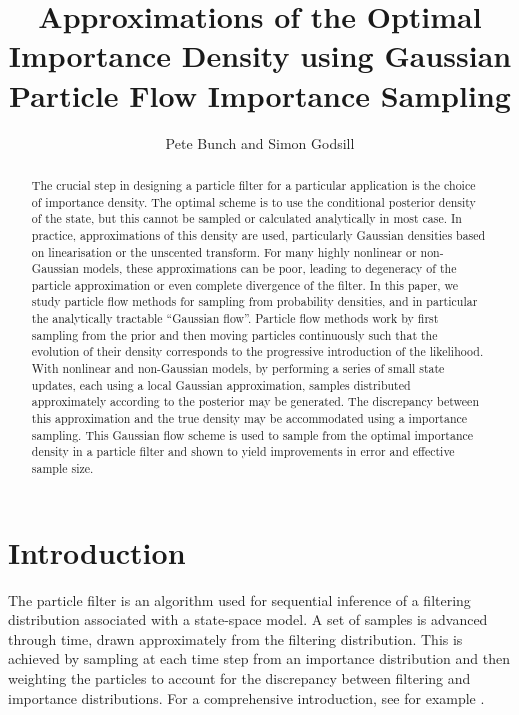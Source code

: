 \documentclass{article}
\title{Approximations of the Optimal Importance Density using Gaussian Particle Flow Importance Sampling}
\author{Pete Bunch and Simon Godsill}
\date{}
\begin{document}
\maketitle

\begin{abstract}
The crucial step in designing a particle filter for a particular application is the choice of importance density. The optimal scheme is to use the conditional posterior density of the state, but this cannot be sampled or calculated analytically in most case. In practice, approximations of this density are used, particularly Gaussian densities based on linearisation or the unscented transform. For many highly nonlinear or non-Gaussian models, these approximations can be poor, leading to degeneracy of the particle approximation or even complete divergence of the filter. In this paper, we study particle flow methods for sampling from probability densities, and in particular the analytically tractable ``Gaussian flow''. Particle flow methods work by first sampling from the prior and then moving particles continuously such that the evolution of their density corresponds to the progressive introduction of the likelihood. With nonlinear and non-Gaussian models, by performing a series of small state updates, each using a local Gaussian approximation, samples distributed approximately according to the posterior may be generated. The discrepancy between this approximation and the true density may be accommodated using a importance sampling. This Gaussian flow scheme is used to sample from the optimal importance density in a particle filter and shown to yield improvements in error and effective sample size.
\end{abstract}






\section{Introduction}

The particle filter is an algorithm used for sequential inference of a filtering distribution associated with a state-space model. A set of samples is advanced through time, drawn approximately from the filtering distribution. This is achieved by sampling at each time step from an importance distribution and then weighting the particles to account for the discrepancy between filtering and importance distributions. For a comprehensive introduction, see for example \citep{Cappe2007,Doucet2009}.
\end{document}
